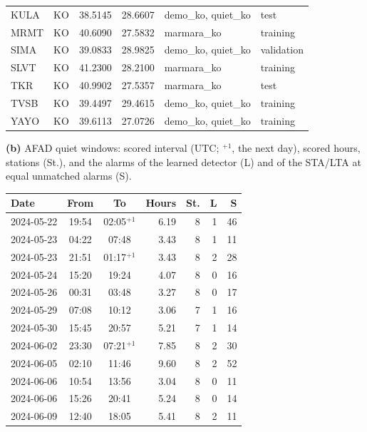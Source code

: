 \documentclass[11pt,a4paper]{article}
\newcommand{\stalta}{STA/LTA}
\newcommand{\panel}[1]{\par\smallskip\noindent\textbf{(#1)}\enskip}
\begin{document}
\begin{table}[htbp]
\begin{tabular}{@{}llrrll@{}}
    KULA & KO & 38.5145 & 28.6607 & demo\_ko, quiet\_ko & test \\
    MRMT & KO & 40.6090 & 27.5832 & marmara\_ko & training \\
    SIMA & KO & 39.0833 & 28.9825 & demo\_ko, quiet\_ko & validation \\
    SLVT & KO & 41.2300 & 28.2100 & marmara\_ko & training \\
    TKR  & KO & 40.9902 & 27.5357 & marmara\_ko & test \\
    TVSB & KO & 39.4497 & 29.4615 & demo\_ko, quiet\_ko & training \\
    YAYO & KO & 39.6113 & 27.0726 & demo\_ko, quiet\_ko & training \\
    \bottomrule
  \end{tabular}

  \bigskip
  \panel{b} AFAD quiet windows: scored interval (UTC; $^{+1}$, the next day),
  scored hours, stations (St.), and the alarms of the learned detector (L) and of
  the \stalta{} at equal unmatched alarms (S).\par\smallskip
  {\footnotesize\setlength{\tabcolsep}{4pt}
    \begin{tabular}[t]{@{}lccrrrr@{}}
      \toprule
      Date & From & To & Hours & St. & L & S \\
      \midrule
      2024-05-22 & 19:54 & 02:05$^{+1}$ & 6.19 & 8 & 1 & 46 \\
      2024-05-23 & 04:22 & 07:48 & 3.43 & 8 & 1 & 11 \\
      2024-05-23 & 21:51 & 01:17$^{+1}$ & 3.43 & 8 & 2 & 28 \\
      2024-05-24 & 15:20 & 19:24 & 4.07 & 8 & 0 & 16 \\
      2024-05-26 & 00:31 & 03:48 & 3.27 & 8 & 0 & 17 \\
      2024-05-29 & 07:08 & 10:12 & 3.06 & 7 & 1 & 16 \\
      2024-05-30 & 15:45 & 20:57 & 5.21 & 7 & 1 & 14 \\
      2024-06-02 & 23:30 & 07:21$^{+1}$ & 7.85 & 8 & 2 & 30 \\
      2024-06-05 & 02:10 & 11:46 & 9.60 & 8 & 2 & 52 \\
      2024-06-06 & 10:54 & 13:56 & 3.04 & 8 & 0 & 11 \\
      2024-06-06 & 15:26 & 20:41 & 5.24 & 8 & 0 & 14 \\
      2024-06-09 & 12:40 & 18:05 & 5.41 & 8 & 2 & 11 \\
      \bottomrule
    \end{tabular}\hfill
}
\end{table}
\end{document}
